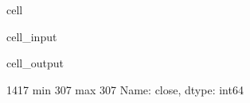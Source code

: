 \documentclass[letterpaper,10pt,english]{jupyterBook}
\begin{document}
\begin{sphinxuseclass}{cell}\begin{sphinxVerbatimInput}

\begin{sphinxuseclass}{cell_input}
\begin{sphinxVerbatim}[commandchars=\\\{\}]
\PYG{p}{[}\PYG{p}{]}
\PYG{p}{[}\PYG{p}{]}\PYG{p}{[}\PYG{p}{]}
\end{sphinxVerbatim}

\end{sphinxuseclass}\end{sphinxVerbatimInput}
\begin{sphinxVerbatimOutput}

\begin{sphinxuseclass}{cell_output}
\begin{sphinxVerbatim}[commandchars=\\\{\}]
1417
min    307
max    307
Name: close, dtype: int64
\end{sphinxVerbatim}

\end{sphinxuseclass}\end{sphinxVerbatimOutput}

\end{sphinxuseclass}






\renewcommand{\indexname}{Index}
\printindex
\end{document}
